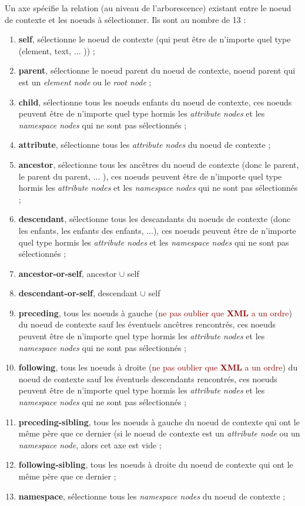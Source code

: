 \documentclass{article}
\newcommand{\red}[1]{\textcolor{darkred}{#1}}
\begin{document}
Un axe spécifie la relation (au niveau de l'arborescence) existant entre le noeud de contexte et les noeuds à sélectionner. Ils sont au nombre de 13 : 
\begin{enumerate}
\item \textbf{self}, sélectionne le noeud de contexte (qui peut être de n'importe quel type (element, text, ... )) ;
\item \textbf{parent}, sélectionne le noeud parent du noeud de contexte, noeud parent qui est un \textit{element node} ou le \textit{root node} ;
\item \textbf{child}, sélectionne tous les noeuds enfants du noeud de contexte, ces noeuds peuvent être de n'importe quel type hormis les \textit{attribute nodes} et les 
\textit{namespace nodes} qui ne sont pas sélectionnés ;
\item \textbf{attribute}, sélectionne tous les \textit{attribute nodes} du noeud de contexte ;
\item \textbf{ancestor}, sélectionne tous les ancêtres du noeud de contexte (donc le parent, le parent du parent, ... ), ces noeuds peuvent être de n'importe quel type hormis les
\textit{attribute nodes} et les \textit{namespace nodes} qui ne sont pas sélectionnés ;
\item \textbf{descendant}, sélectionne tous les descandants du noeuds de contexte (donc les enfants, les enfants des enfants, ...), ces noeuds peuvent être de n'importe quel type 
hormis les \textit{attribute nodes} et les \textit{namespace nodes} qui ne sont pas sélectionnés ; 
\item \textbf{ancestor-or-self}, ancestor $\cup$ self
\item \textbf{descendant-or-self}, descendant $\cup$ self
\item \textbf{preceding}, tous les noeuds à gauche (\red{ne pas oublier que \textbf{XML} a un ordre}) du noeud de contexte sauf les éventuels ancêtres rencontrés, ces noeuds 
peuvent être de n'importe quel type hormis les \textit{attribute nodes} et les \textit{namespace nodes} qui ne sont pas sélectionnés ; 
\item \textbf{following}, tous les noeuds à droite (\red{ne pas oublier que \textbf{XML} a un ordre}) du noeud de contexte sauf les éventuels descendants rencontrés, ces noeuds 
peuvent être de n'importe quel type hormis les \textit{attribute nodes} et les \textit{namespace nodes} qui ne sont pas sélectionnés ; 
\item \textbf{preceding-sibling}, tous les noeuds à gauche du noeud de contexte qui ont le même père que ce dernier (si le noeud de contexte est un \textit{attribute node} ou un
\textit{namespace node}, alors cet axe est vide ;
\item \textbf{following-sibling},  tous les noeuds à droite du noeud de contexte qui ont le même père que ce dernier ;
\item \textbf{namespace}, sélectionne tous les \textit{namespace nodes} du noeud de contexte ;
\end{enumerate}
\end{document}
